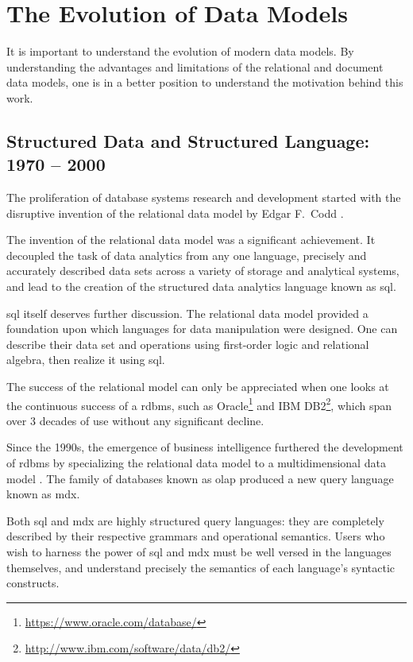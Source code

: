 \section{The Evolution of Data Models}
	It is important to understand the evolution of modern data models.  By understanding the advantages and limitations of the relational and document data models, one is in a better position to understand the motivation behind this work.
	
	\subsection{Structured Data and Structured Language:  1970 -- 2000}
		The proliferation of database systems research and development started with the disruptive invention of the relational data model by Edgar F.~Codd \cite{codd-79}.
		
		The invention of the relational data model was a significant achievement.  It decoupled the task of data analytics from any one language, precisely and accurately described data sets across a variety of storage and analytical systems, and lead to the creation of the structured data analytics language known as \acrfull{sql}.
		
		\gls{sql} itself deserves further discussion.  The relational data model provided a foundation upon which languages for data manipulation were designed.  One can describe their data set and operations using first-order logic and relational algebra, then realize it using \gls{sql}.
		
		The success of the relational model can only be appreciated when one looks at the continuous success of a \gls{rdbms}, such as Oracle\footnote{\url{https://www.oracle.com/database/}} and IBM DB2\footnote{\url{http://www.ibm.com/software/data/db2/}}, which span over 3 decades of use without any significant decline.
		
		Since the 1990s, the emergence of business intelligence \cite{bikm-02} furthered the development of \gls{rdbms} by specializing the relational data model to a multidimensional data model \cite{colliat-96}.  The family of databases known as \gls{olap} produced a new query language known as \gls{mdx}.
		
		Both \gls{sql} and \gls{mdx} are highly structured query languages: they are completely described by their respective grammars and operational semantics.  Users who wish to harness the power of \gls{sql} and \gls{mdx} must be well versed in the languages themselves, and understand precisely the semantics of each language's syntactic constructs.
		
